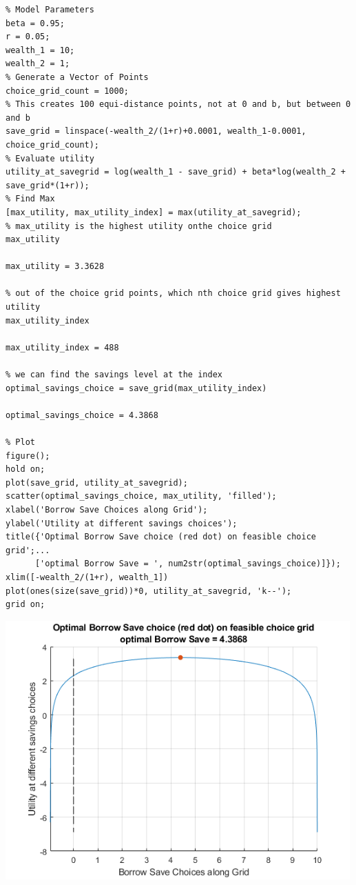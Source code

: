 \documentclass[
]{book}
\begin{document}
\begin{verbatim}
% Model Parameters
beta = 0.95;
r = 0.05;
wealth_1 = 10;
wealth_2 = 1;
% Generate a Vector of Points
choice_grid_count = 1000;
% This creates 100 equi-distance points, not at 0 and b, but between 0 and b
save_grid = linspace(-wealth_2/(1+r)+0.0001, wealth_1-0.0001, choice_grid_count);
% Evaluate utility
utility_at_savegrid = log(wealth_1 - save_grid) + beta*log(wealth_2 + save_grid*(1+r));
% Find Max
[max_utility, max_utility_index] = max(utility_at_savegrid);
% max_utility is the highest utility onthe choice grid
max_utility

max_utility = 3.3628

% out of the choice grid points, which nth choice grid gives highest utility
max_utility_index

max_utility_index = 488

% we can find the savings level at the index
optimal_savings_choice = save_grid(max_utility_index)

optimal_savings_choice = 4.3868

% Plot
figure();
hold on;
plot(save_grid, utility_at_savegrid);
scatter(optimal_savings_choice, max_utility, 'filled');
xlabel('Borrow Save Choices along Grid');
ylabel('Utility at different savings choices');
title({'Optimal Borrow Save choice (red dot) on feasible choice grid';...
      ['optimal Borrow Save = ', num2str(optimal_savings_choice)]});
xlim([-wealth_2/(1+r), wealth_1])  
plot(ones(size(save_grid))*0, utility_at_savegrid, 'k--');
grid on;
\end{verbatim}

\includegraphics[width=5.20833in,height=\textheight]{img/K_save_households_images/figure_0.png}
\end{document}
